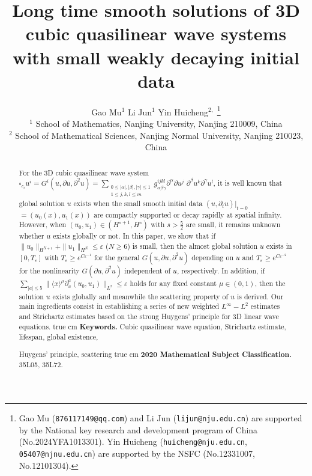 \documentclass[11pt,twoside]{article}
\title{Long time smooth solutions of 3D cubic quasilinear wave systems with small weakly decaying initial data}
\def\ds{\displaystyle}
\def\f{\frac}
\def\p{\partial}
\def\ve{\varepsilon}
\newcommand{\w}[1]{\langle {#1} \rangle}
\theoremstyle{plain}
\theoremstyle{definition}
\numberwithin{equation}{section}
\begin{document}
\author{
  Gao Mu$^{1}$ \quad Li Jun$^{1}$ \quad Yin Huicheng$^{2,}$
   \footnote{Gao Mu (\texttt{876117149@qq.com}) and Li Jun (\texttt{lijun@nju.edu.cn})
    are supported by the National key research and development program of China (No.2024YFA1013301).
   Yin Huicheng (\texttt{huicheng@nju.edu.cn}, \texttt{05407@njnu.edu.cn}) are supported by the NSFC (No.12331007, No.12101304).}
    \\[0.5cm]
  \small
    $^{1}$ School of Mathematics, Nanjing University, Nanjing 210009, China\\
  \small
   $^{2}$ School of Mathematical Sciences, Nanjing Normal University, Nanjing 210023, China
}
\date{}
\maketitle

\thispagestyle{empty}
\begin{abstract}
For the 3D cubic quasilinear wave system $\square_{c_i} u^i=G^i(u,\p u,\p^2u)
=\ds\sum_{\substack{0\le|\alpha|,|\beta|,|\gamma|\le1 \\ 1\le j,k,l \le m}} g_{\alpha\beta\gamma}^{ijkl}\p^{\alpha}\p u^j$ $\p^{\beta}u^k\p^{\gamma}u^l$,
it is well known that global solution $u$ exists when the small smooth initial data
$(u,\p_tu)|_{t=0}$ $=(u_0(x), u_1(x))$ are compactly supported
or decay rapidly at spatial infinity. However, when $(u_0, u_1)\in (H^{s+1}, H^s)$ with $s>\f{5}{2}$ are small, it remains unknown
whether $u$ exists globally or not. In this paper, we show that if $\|u_{0}\|_{H^{N+1}}+\|u_{1}\|_{H^N}\le\ve$
($N\ge 6$) is small, then the almost global solution $u$ exists in $[0, T_{\ve}]$ with $T_{\ve}\ge e^{C\ve^{-1}}$
for the general $G(u,\p u,\p^2u)$ depending on $u$ and $T_{\ve}\ge e^{C\ve^{-2}}$ for the nonlinearity $G(\p u,\p^2u)$ independent of $u$, respectively.
In addition, if $\ds\sum_{|a|\le 5}\|\w{x}^{\mu}\p^a_x(u _0,u_1)\|_{L^2}\le\ve$ holds for any fixed constant $\mu\in (0,1)$, then
the solution $u$ exists globally and meanwhile the scattering property of $u$ is derived. Our main ingredients consist in establishing a series of new weighted $L^\infty-L^2$ estimates and Strichartz estimates based on the strong Huygens' principle for 3D linear wave equations.
	 true cm
	\noindent
	\textbf{Keywords.} Cubic quasilinear wave equation, Strichartz estimate, lifespan, global existence,

\qquad \quad  Huygens' principle, scattering
	 true cm
	\noindent
	\textbf{2020 Mathematical Subject Classification.}  35L05, 35L72.
\end{abstract}
\end{document}
